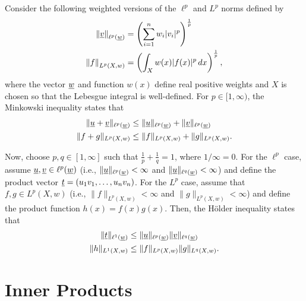 \begin{theorem} \label{thm:HolderMinkowski}

Consider the following weighted versions of the $\ell^p$ and $L^p$ norms defined by
\begin{align*}
\left\| \underline{v} \right\|_{\ell^p (\underline{w})} &= \left( \sum_{i=1}^n w_i |v_i|^p \right)^{\frac{1}{p}} \\
\left\| f \right\|_{L^p (X,w)} &= \left( \int_X w(x) |f(x)|^p \, dx \right)^{\frac{1}{p}},
\end{align*}
where the vector $\underline{w}$ and function $w(x)$ define real positive weights and $X$ is chosen so that the Lebesgue integral is well-defined.
For $p\in [1,\infty)$, the Minkowski inequality states that
\begin{align*}
\| \underline{u} + \underline{v} \|_{\ell^p (\underline{w})} &\leq \| \underline{u} \|_{\ell^p (\underline{w})} + \| \underline{v} \|_{\ell^p (\underline{w})} \\
\| f+g \|_{L^p (X,w)} &\leq \| f \|_{L^p (X,w)} + \|g \|_{L^p (X,w)}.
\end{align*}

Now, choose $p,q \in [1,\infty]$ such that $\frac{1}{p}+\frac{1}{q} = 1$, where $1/\infty=0$.
For the $\ell^p$ case, assume $\underline{u},\underline{v} \in \ell^p (\underline{w}) $ (i.e., $\| \underline{u} \|_{\ell^p (\underline{w})} < \infty$ and $\| \underline{u} \|_{\ell^q (\underline{w})} < \infty$) and define the product vector $\underline{t} = (u_1 v_1,\ldots, u_n v_n)$.
For the $L^p$ case, assume that $f,g \in L^p (X,w)$ (i.e., $\| f \|_{L^p (X,w)} < \infty$ and $\| g \|_{L^p (X,w)} < \infty$) and define the product function $h(x) = f(x) g(x)$.
Then, the H\"{o}lder inequality states that
\begin{align*}
\| \underline{t} \|_{\ell^1 (\underline{w})} &\leq \| \underline{u} \|_{\ell^p (\underline{w})} \| \underline{v} \|_{\ell^q (\underline{w})} \\
\| h \|_{L^1 (X,w)} &\leq \| f \|_{L^p (X,w)} \|g \|_{L^q (X,w)}.
\end{align*}

\end{theorem}


\section{Inner Products}

